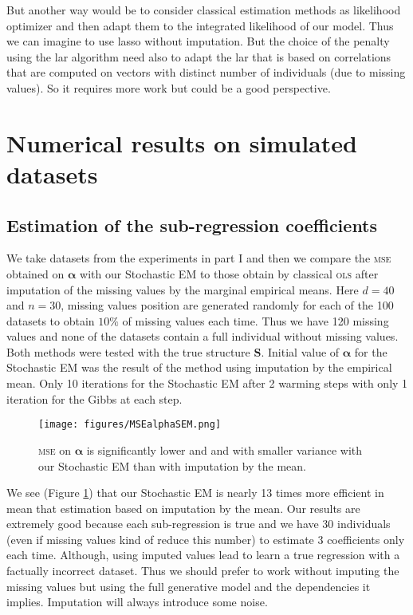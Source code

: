 \documentclass[12pt,a4paper]{report}
\begin{document}
		
		But another way would be to consider classical estimation methods as likelihood optimizer and then adapt them to the integrated likelihood of our model. Thus we can imagine to use {\sc lasso} without imputation. But the choice of the penalty using the {\sc lar} algorithm need also to adapt the {\sc lar} that is based on correlations that are computed on vectors with distinct number of individuals (due to missing values). So it requires more work but could be a good perspective.
	\section{Numerical results on simulated datasets}
		\subsection{Estimation of the sub-regression coefficients}
			We take datasets from the experiments in part I and then we compare the \textsc{mse} obtained on $\boldsymbol{\alpha}$ with our Stochastic EM to those obtain by classical \textsc{ols} after imputation of the missing values by the marginal empirical means. Here $d=40$ and $n=30$, missing values position are generated randomly for each of the 100 datasets to obtain $10 \%$ of missing values each time. Thus we have 120 missing values and none of the datasets contain a full individual without missing values.
Both methods were tested with the true structure $\boldsymbol{S}$. Initial value of $\boldsymbol{\alpha}$ for the Stochastic EM was the result of the method using imputation by the empirical mean. Only 10 iterations for the Stochastic EM after 2 warming steps with only 1 iteration for the Gibbs at each step.

\begin{figure}[h!]
	\centering
	\texttt{[image: figures/MSEalphaSEM.png]} 
	\caption{\textsc{mse} on $\boldsymbol{\alpha}$ is significantly lower and and with smaller variance with our Stochastic EM than with imputation by the mean.}\label{MSEalphaSEM}
\end{figure}

	We see (Figure \ref{MSEalphaSEM}) that our Stochastic EM is nearly 13 times more efficient in mean that estimation based on imputation by the mean. Our results are extremely good because each sub-regression is true and we have 30 individuals (even if missing values kind of reduce this number) to estimate 3 coefficients only each time. Although, using imputed values lead to learn a true regression with a factually incorrect dataset. Thus we should prefer to work without imputing the missing values but using the full generative model and the dependencies it implies. Imputation will always introduce some noise.
\end{document}
